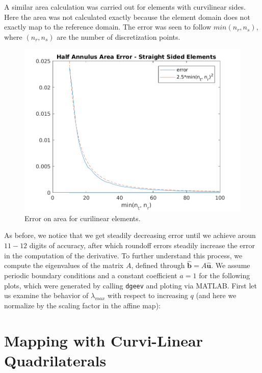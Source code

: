 \documentclass{article}
\begin{document}
A similar area calculation was carried out for elements with curvilinear sides. Here the area was not calculated exactly because the element domain does not exactly map to the reference domain. The error was seen to follow $min(n_r,n_s)$, where $(n_r, n_s)$ are the number of discretization points.

\begin{figure}[H]
  \centering
  \includegraphics[scale=0.5]{media/5-3-error.png}
  
  \caption{Error on area for curilinear elements.}
  \label{fig:spatDer}
\end{figure}

\noindent As before, we notice that we get steadily decreasing error until we achieve aroun $11-12$ digits of accuracy, after which roundoff errors steadily increase the error in the computation of the derivative. To further understand this process, we compute the eigenvalues of the matrix $A$, defined through $\boldsymbol{\hat{b}} = A \boldsymbol{\hat{u}}$. We assume periodic boundary conditions and a constant coefficient $a = 1$ for the following plots, which were generated by calling \verb|dgeev| and ploting via MATLAB. First let us examine the behavior of $\lambda _{max}$ with respect to increasing $q$ (and here we normalize by the scaling factor in the affine map):


\section{Mapping with Curvi-Linear Quadrilaterals}
\end{document}
